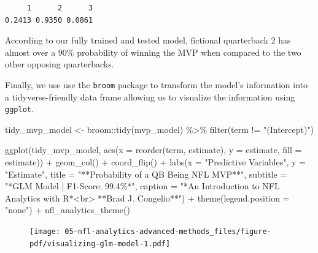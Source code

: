 \documentclass[
  letterpaper,
]{krantz}
\newenvironment{Shaded}{\begin{snugshade}}{\end{snugshade}}
\newcommand{\AttributeTok}[1]{\textcolor[rgb]{0.40,0.45,0.13}{#1}}
\newcommand{\FunctionTok}[1]{\textcolor[rgb]{0.28,0.35,0.67}{#1}}
\newcommand{\NormalTok}[1]{\textcolor[rgb]{0.00,0.23,0.31}{#1}}
\newcommand{\OtherTok}[1]{\textcolor[rgb]{0.00,0.23,0.31}{#1}}
\newcommand{\SpecialCharTok}[1]{\textcolor[rgb]{0.37,0.37,0.37}{#1}}
\newcommand{\StringTok}[1]{\textcolor[rgb]{0.13,0.47,0.30}{#1}}
\begin{document}
\begin{verbatim}
     1      2      3 
0.2413 0.9350 0.0861 
\end{verbatim}

According to our fully trained and tested model, fictional quarterback 2
has almost over a 90\% probability of winning the MVP when compared to
the two other opposing quarterbacks.

Finally, we use use the \texttt{broom} package to transform the model's
information into a tidyverse-friendly data frame allowing us to
visualize the information using \texttt{ggplot}.

\begin{Shaded}
\begin{Highlighting}[]
\NormalTok{tidy\_mvp\_model }\OtherTok{\textless{}{-}}\NormalTok{ broom}\SpecialCharTok{::}\FunctionTok{tidy}\NormalTok{(mvp\_model) }\SpecialCharTok{\%\textgreater{}\%}
  \FunctionTok{filter}\NormalTok{(term }\SpecialCharTok{!=} \StringTok{"(Intercept)"}\NormalTok{)}

\FunctionTok{ggplot}\NormalTok{(tidy\_mvp\_model, }\FunctionTok{aes}\NormalTok{(}\AttributeTok{x =} \FunctionTok{reorder}\NormalTok{(term, estimate),}
                           \AttributeTok{y =}\NormalTok{ estimate, }\AttributeTok{fill =}\NormalTok{ estimate)) }\SpecialCharTok{+}
  \FunctionTok{geom\_col}\NormalTok{() }\SpecialCharTok{+}
  \FunctionTok{coord\_flip}\NormalTok{() }\SpecialCharTok{+}
  \FunctionTok{labs}\NormalTok{(}\AttributeTok{x =} \StringTok{"Predictive Variables"}\NormalTok{,}
       \AttributeTok{y =} \StringTok{"Estimate"}\NormalTok{,}
       \AttributeTok{title =} \StringTok{"**Probability of a QB Being NFL MVP**"}\NormalTok{,}
       \AttributeTok{subtitle =} \StringTok{"*GLM Model | F1{-}Score: 99.4\%*"}\NormalTok{,}
       \AttributeTok{caption =} \StringTok{"*An Introduction to NFL Analytics with R*\textless{}br\textgreater{}}
\StringTok{       **Brad J. Congelio**"}\NormalTok{) }\SpecialCharTok{+}
  \FunctionTok{theme}\NormalTok{(}\AttributeTok{legend.position =} \StringTok{"none"}\NormalTok{) }\SpecialCharTok{+}
  \FunctionTok{nfl\_analytics\_theme}\NormalTok{()}
\end{Highlighting}
\end{Shaded}

\begin{figure}[H]

{\centering \texttt{[image: 05-nfl-analytics-advanced-methods\_files/figure-pdf/visualizing-glm-model-1.pdf]}

}

\end{figure}
\end{document}
